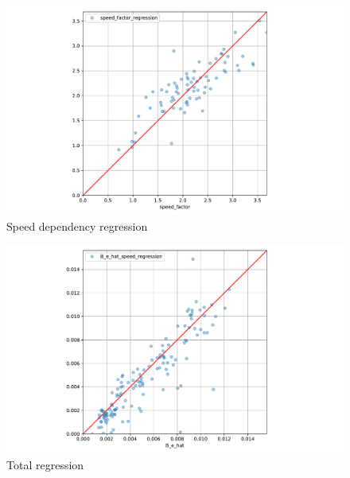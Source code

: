 \begin{figure}[H]
    \centering
    \includegraphics[width=\columnwidth]{figures/B_e_factor_regression.pdf}
    \caption{Speed dependency regression}
    \label{fig:B_e_factor_regression}
\end{figure}

\begin{figure}[H]
    \centering
    \includegraphics[width=\columnwidth]{figures/B_e_factor_regression_total.pdf}
    \caption{Total regression}
    \label{fig:B_e_factor_regression_total}
\end{figure}


